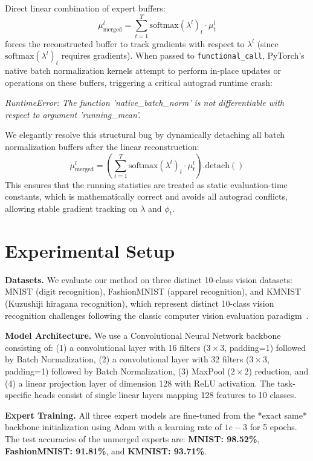 \documentclass{article}
\begin{document}
Direct linear combination of expert buffers:
\begin{equation}
    \mu^l_{\text{merged}} = \sum_{t=1}^T \text{softmax}(\lambda^l)_t \cdot \mu^l_t
\end{equation}
forces the reconstructed buffer to track gradients with respect to $\lambda^l$ (since $\text{softmax}(\lambda^l)_t$ requires gradients). When passed to \texttt{functional\_call}, PyTorch's native batch normalization kernels attempt to perform in-place updates or operations on these buffers, triggering a critical autograd runtime crash:
\begin{center}
    \textit{RuntimeError: The function 'native\_batch\_norm' is not differentiable with respect to argument 'running\_mean'.}
\end{center}
We elegantly resolve this structural bug by dynamically detaching all batch normalization buffers after the linear reconstruction:
\begin{equation}
    \mu^l_{\text{merged}} = \left( \sum_{t=1}^T \text{softmax}(\lambda^l)_t \cdot \mu^l_t \right).\text{detach}()
\end{equation}
This ensures that the running statistics are treated as static evaluation-time constants, which is mathematically correct and avoids all autograd conflicts, allowing stable gradient tracking on $\lambda$ and $\phi_t$.

\section{Experimental Setup}
\label{sec:setup}
\textbf{Datasets.} We evaluate our method on three distinct 10-class vision datasets: MNIST (digit recognition), FashionMNIST (apparel recognition), and KMNIST (Kuzushiji hiragana recognition), which represent distinct 10-class vision recognition challenges following the classic computer vision evaluation paradigm~\cite{deng09}. 

\textbf{Model Architecture.} We use a Convolutional Neural Network backbone consisting of: (1) a convolutional layer with 16 filters ($3 \times 3$, padding=1) followed by Batch Normalization, (2) a convolutional layer with 32 filters ($3 \times 3$, padding=1) followed by Batch Normalization, (3) MaxPool ($2\times 2$) reduction, and (4) a linear projection layer of dimension 128 with ReLU activation. The task-specific heads consist of single linear layers mapping 128 features to 10 classes.

\textbf{Expert Training.} All three expert models are fine-tuned from the *exact same* backbone initialization using Adam with a learning rate of $1e-3$ for 5 epochs. The test accuracies of the unmerged experts are: \textbf{MNIST: 98.52\%}, \textbf{FashionMNIST: 91.81\%}, and \textbf{KMNIST: 93.71\%}.
\end{document}
